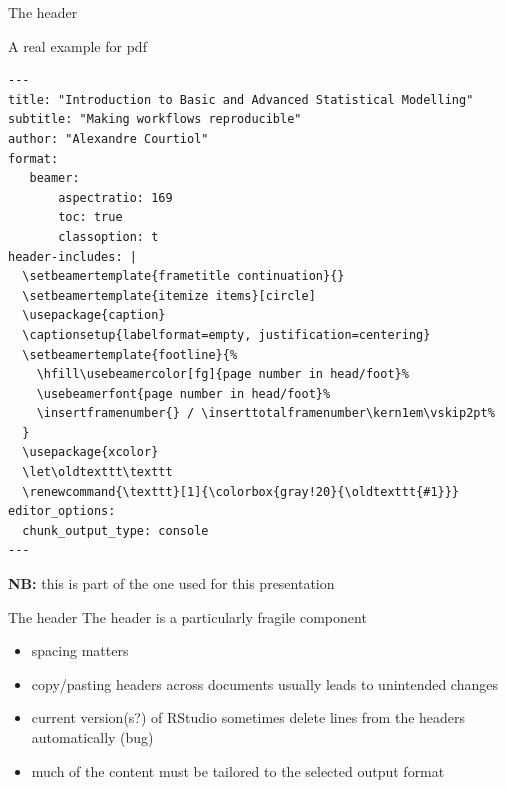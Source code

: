 \documentclass[
  ignorenonframetext,
  aspectratio=169,
  t]{beamer}
\providecommand{\tightlist}{%
  \setlength{\itemsep}{0pt}\setlength{\parskip}{0pt}}
\let\oldtexttt\texttt
\renewcommand{\texttt}[1]{\colorbox{gray!20}{\oldtexttt{#1}}}
\begin{document}
\begin{frame}[fragile]{The header}
\protect{}\label{the-header-2}
\begin{block}{A real example for pdf}
\protect{}\label{a-real-example-for-pdf}
\begingroup\tiny

\begin{verbatim}
---
title: "Introduction to Basic and Advanced Statistical Modelling"
subtitle: "Making workflows reproducible"
author: "Alexandre Courtiol"
format:
   beamer:
       aspectratio: 169
       toc: true
       classoption: t
header-includes: |
  \setbeamertemplate{frametitle continuation}{}
  \setbeamertemplate{itemize items}[circle]
  \usepackage{caption}
  \captionsetup{labelformat=empty, justification=centering}
  \setbeamertemplate{footline}{%
    \hfill\usebeamercolor[fg]{page number in head/foot}%
    \usebeamerfont{page number in head/foot}%
    \insertframenumber{} / \inserttotalframenumber\kern1em\vskip2pt%
  }
  \usepackage{xcolor}
  \let\oldtexttt\texttt
  \renewcommand{\texttt}[1]{\colorbox{gray!20}{\oldtexttt{#1}}}
editor_options: 
  chunk_output_type: console
---
\end{verbatim}

\endgroup

\textbf{NB:} this is part of the one used for this presentation
\end{block}
\end{frame}

\begin{frame}{The header}
\protect{}\label{the-header-3}
The header is a particularly fragile component

\begin{itemize}
\tightlist
\item
  spacing matters
\item
  copy/pasting headers across documents usually leads to unintended
  changes
\item
  current version(s?) of RStudio sometimes delete lines from the headers
  automatically (bug)
\item
  much of the content must be tailored to the selected output format
\end{itemize}
\end{frame}
\end{document}
